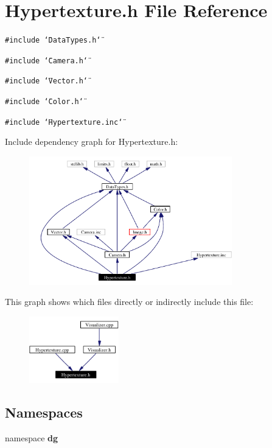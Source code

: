 \section{Hypertexture.h File Reference}
\label{Hypertexture_8h}
{\tt \#include \char`\"{}Data\-Types.h\char`\"{}}\par
{\tt \#include \char`\"{}Camera.h\char`\"{}}\par
{\tt \#include \char`\"{}Vector.h\char`\"{}}\par
{\tt \#include \char`\"{}Color.h\char`\"{}}\par
{\tt \#include \char`\"{}Hypertexture.inc\char`\"{}}\par


Include dependency graph for Hypertexture.h:\begin{figure}[H]
\begin{center}
\leavevmode
\includegraphics[width=250pt]{Hypertexture_8h__incl}
\end{center}
\end{figure}


This graph shows which files directly or indirectly include this file:\begin{figure}[H]
\begin{center}
\leavevmode
\includegraphics[width=110pt]{Hypertexture_8h__dep__incl}
\end{center}
\end{figure}
\subsection*{Namespaces}
\begin{CompactItemize}
\item 
namespace {\bf dg}
\end{CompactItemize}
